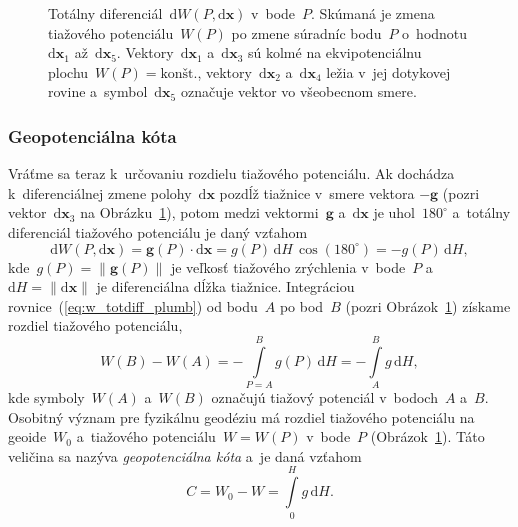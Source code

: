 \documentclass[a4paper, 12pt]{book}
\newcommand{\diff}{\mathrm d}
\let\vec\mathbf
\begin{document}
\begin{figure}
\centering

\caption{Totálny diferenciál~$\diff W(P, \diff \vec x)$ v~bode~$P$.  Skúmaná je 
zmena tiažového potenciálu~$W(P)$ po zmene súradníc bodu~$P$ o~hodnotu $\diff 
\vec x_1$ až~$\diff \vec x_5$.  Vektory~$\diff \vec x_1$ a~$\diff \vec x_3$ sú 
kolmé na ekvipotenciálnu plochu~$W(P) = \textrm{kon\v{s}t.}$, vektory~$\diff 
\vec x_2$ a~$\diff \vec x_4$ ležia v~jej dotykovej rovine a~symbol~$\diff \vec 
x_5$ označuje vektor vo všeobecnom smere.}
\label{fig:total_differential}
\end{figure}

\subsubsection{Geopotenciálna kóta}
\label{sec:geopotential_number}

Vráťme sa teraz k~určovaniu rozdielu tiažového potenciálu.  Ak dochádza 
k~diferenciálnej zmene polohy~$\diff \vec x$ pozdĺž tiažnice v~smere vektora 
$-\vec g$ (pozri vektor~$\diff \vec x_3$ na 
Obrázku~\ref{fig:total_differential}), potom medzi vektormi~$\vec g$ a~$\diff 
\vec x$ je uhol~$180^{\circ}$ a~totálny diferenciál tiažového potenciálu je 
daný vzťahom
%
\begin{equation}
\label{eq:w_totdiff_plumb}
\diff W(P, \diff \vec x) = \vec g(P) \cdot \diff \vec x = g(P) \, \diff H \, 
\cos(180^{\circ}) = -g(P) \, \diff H{,}
\end{equation}
%
kde~$g(P) = \| \vec g(P) \|$ je veľkosť tiažového zrýchlenia v~bode~$P$ 
a~$\diff H = \| \diff \vec x \|$ je diferenciálna dĺžka tiažnice.  Integráciou 
rovnice~(\ref{eq:w_totdiff_plumb}) od bodu~$A$ po bod~$B$ (pozri 
Obrázok~\ref{fig:total_differential}) získame rozdiel tiažového potenciálu,
%
\begin{equation}
\label{eq:w_ab}
W(B) - W(A) = -\int\limits_{P = A}^{B} g(P) \, \diff H = -\int\limits_{A}^{B} 
g \, \diff H{,}
\end{equation}
%
kde symboly~$W(A)$ a~$W(B)$ označujú tiažový potenciál v~bodoch~$A$ a~$B$.  
Osobitný význam pre fyzikálnu geodéziu má rozdiel tiažového potenciálu na 
geoide~$W_0$ a~tiažového potenciálu~$W = W(P)$ v~bode~$P$ 
(Obrázok~\ref{fig:total_differential}).  Táto veličina sa nazýva 
\emph{geopotenciálna kóta} a~je daná vzťahom
%
\begin{equation}
\label{eq:geopotential_number}
C = W_0 - W = \int\limits_0^H g \, \diff H{.}
\end{equation}
\end{document}
